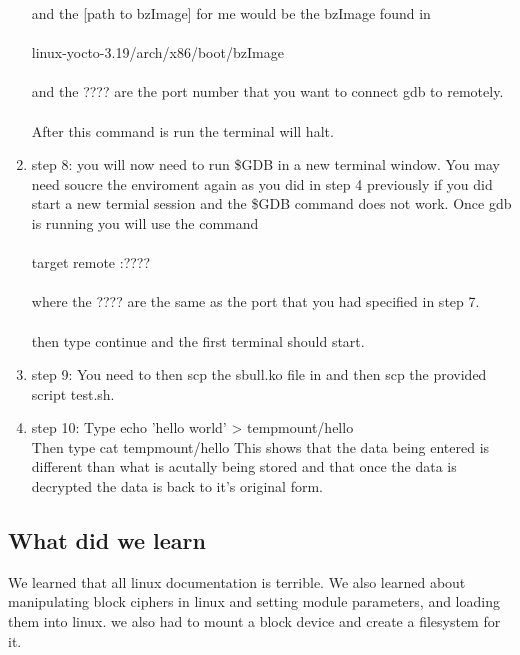 \documentclass[letterpaper,10pt,titlepage]{article}
\begin{document}
\begin{enumerate}
   and the [path to bzImage] for me would be the bzImage found in\\\\
   linux-yocto-3.19/arch/x86/boot/bzImage\\\\
   and the ???? are the port number that you want to connect gdb to remotely.\\\\
   After this command is run the terminal will halt.
\item{step 8: }
   you will now need to run \$GDB in a new terminal window. You may need soucre 
   the enviroment again as you did in step 4 previously if you did start a new 
   termial session and the \$GDB command does not work. Once gdb is running you 
   will use the command\\\\
   target remote :????\\\\
   where the ???? are the same as the port that you had specified in step 7.\\\\
   then type continue and the first terminal should start.
\item{step 9:}
   You need to then scp the sbull.ko file in and then scp the provided script test.sh.
\item{step 10:}
   Type echo 'hello world' > tempmount/hello\\
   Then type cat tempmount/hello
   This shows that the data being entered is different than what is acutally being stored and that once the data is decrypted the data is back to 
   it's original form.
   
   
\end{enumerate}
\subsection{What did we learn}
We learned that all linux documentation is terrible. We also learned about manipulating 
block ciphers in linux and setting module parameters, and loading them into linux. we also had
to mount a block device and create a filesystem for it.
\end{document}
